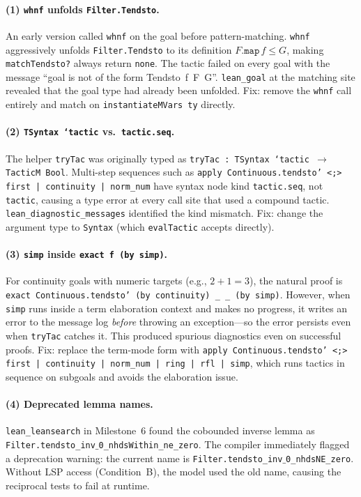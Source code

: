 \documentclass{llncs}
\begin{document}
\paragraph{(1) \texttt{whnf} unfolds \texttt{Filter.Tendsto}.}
An early version called \texttt{whnf} on the goal before pattern-matching.
\texttt{whnf} aggressively unfolds \texttt{Filter.Tendsto} to its definition
$F.\texttt{map}\,f \leq G$, making \texttt{matchTendsto?} always return
\texttt{none}.  The tactic failed on every goal with the message
``goal is not of the form Tendsto~f~F~G''.
\texttt{lean\_goal} at the matching site revealed that the goal type had
already been unfolded.  Fix: remove the \texttt{whnf} call entirely and
match on \texttt{instantiateMVars ty} directly.

\paragraph{(2) \texttt{TSyntax `tactic} vs.\ \texttt{tactic.seq}.}
The helper \texttt{tryTac} was originally typed as
\texttt{tryTac : TSyntax `tactic $\to$ TacticM Bool}.
Multi-step sequences such as
\texttt{apply Continuous.tendsto' <;> first | continuity | norm\_num}
have syntax node kind \texttt{tactic.seq}, not \texttt{tactic},
causing a type error at every call site that used a compound tactic.
\texttt{lean\_diagnostic\_messages} identified the kind mismatch.
Fix: change the argument type to \texttt{Syntax}
(which \texttt{evalTactic} accepts directly).

\paragraph{(3) \texttt{simp} inside \texttt{exact~f~(by~simp)}.}
For continuity goals with numeric targets (e.g., $2+1=3$),
the natural proof is \texttt{exact Continuous.tendsto' (by continuity) \_ \_ (by simp)}.
However, when \texttt{simp} runs inside a term elaboration context and makes
no progress, it writes an error to the message log \emph{before} throwing an
exception---so the error persists even when \texttt{tryTac} catches it.
This produced spurious diagnostics even on successful proofs.
Fix: replace the term-mode form with
\texttt{apply Continuous.tendsto' <;> first | continuity | norm\_num | ring | rfl | simp},
which runs tactics in sequence on subgoals and avoids the elaboration issue.

\paragraph{(4) Deprecated lemma names.}
\texttt{lean\_leansearch} in Milestone~6 found the cobounded inverse lemma as
\texttt{Filter.tendsto\_inv$\text{\_}$0\_nhdsWithin\_ne\_zero}.  The compiler
immediately flagged a deprecation warning:
the current name is \texttt{Filter.tendsto\_inv$\text{\_}$0\_nhdsNE\_zero}.
Without LSP access (Condition~B), the model used the old name, causing
the reciprocal tests to fail at runtime.
\end{document}
